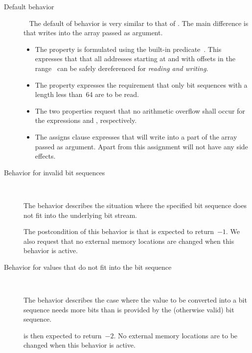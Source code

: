 \begin{description}
\item[Default behavior]~
The default of \poke behavior is very similar to that of \peek.
The main difference is that \poke writes into the array passed as argument.

\begin{itemize}
\item
The property  is formulated using
the built-in \acsl predicate~\inl{\\valid}.
This expresses that that all addresses starting at 
and with offsets in the range~
can be safely dereferenced for \emph{reading and writing}.

\item
The property  expresses the requirement that only
bit sequences with a length less than~64 are to be read.

\item
The two  properties request that no arithmetic overflow
shall occur for the expressions  and
, respectively.

\item
The assigns clause expresses that \poke will 
write into a part of the array passed as argument.
Apart from this assignment \poke will not have any side effects.
      
\end{itemize}

\item[Behavior for invalid bit sequences]~

The behavior  describes the situation where
the specified bit sequence does not fit into the underlying bit stream.

The postcondition of this behavior is that \poke is expected to return~$-1$.
We also request that no external memory locations are changed when this behavior is active.


\item[Behavior for values that do not fit into the bit sequence]~

The behavior  describes the case where the
value to be converted into a bit sequence needs more bits than
is provided by the (otherwise valid) bit sequence.

\poke is then expected to return~$-2$.
No external memory locations are to be changed when this behavior is active.


\end{description}
